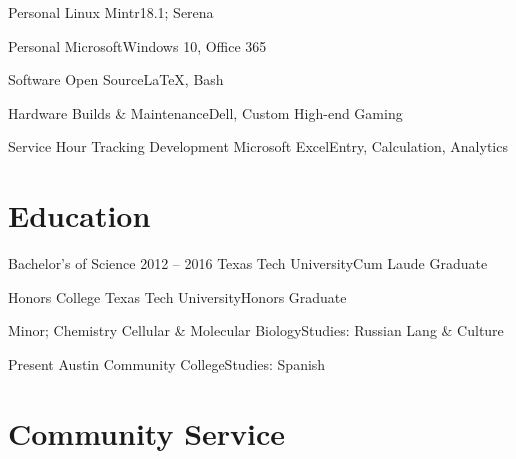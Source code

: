 \documentclass{tccv}
\begin{document}
\begin{yearlist}

\item
	[]{Personal}
	{Linux Mint}{r18.1; Serena}

\item
	[]{Personal}
	{Microsoft}{Windows 10, Office 365}

\item
	[]{Software}
	{Open Source}{LaTeX, Bash}
	
\item
	[]{Hardware}
	{Builds \& Maintenance}{Dell, Custom High-end Gaming}
	
\item
	[Service Hour Tracking]{Development}
	{Microsoft Excel}{Entry, Calculation, Analytics}

\end{yearlist}



%
%


\vspace{50mm}

\section{Education}

\begin{yearlist}

\item
	[Bachelor's of Science]{2012 -- 2016}
	{Texas Tech University}{Cum Laude Graduate}

\item
	[Honors College]{}
	{Texas Tech University}{Honors Graduate}

\item
	[Minor; Chemistry]{}
	{Cellular \& Molecular Biology}{Studies: Russian Lang \& Culture}
	
\item
	[]{Present}
	{Austin Community College}{Studies: Spanish}

\end{yearlist}

\section{Community Service}
\end{document}
